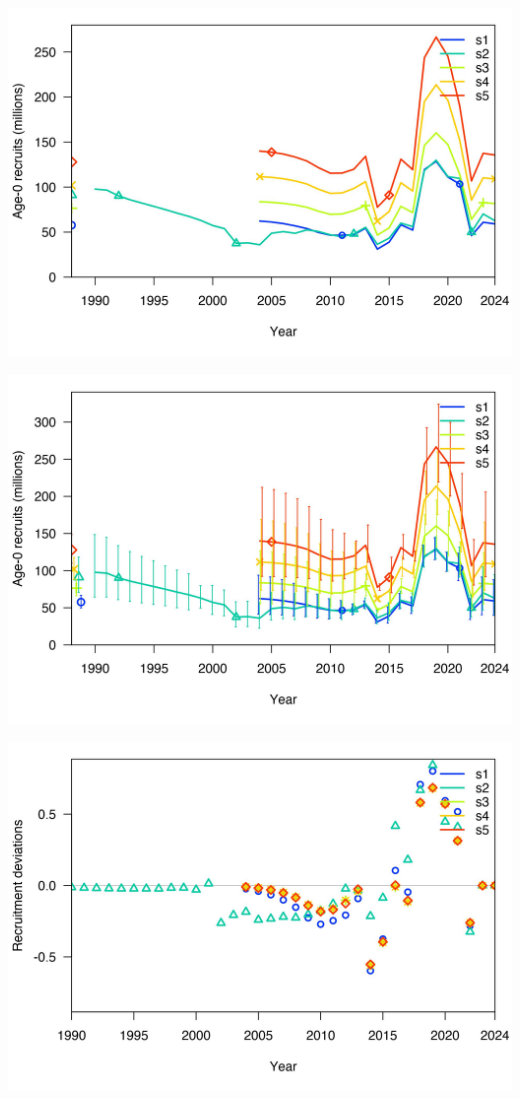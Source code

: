 \documentclass[
]{article}
\begin{document}
\begin{center}\includegraphics{Dtrunculus_SS3_2024_files/figure-latex/unnamed-chunk-17-8} \end{center}

\begin{center}\includegraphics{Dtrunculus_SS3_2024_files/figure-latex/unnamed-chunk-17-9} \end{center}

\begin{center}\includegraphics{Dtrunculus_SS3_2024_files/figure-latex/unnamed-chunk-17-10} \end{center}
\end{document}
